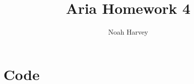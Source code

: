 \documentclass{report}
\begin{document}
\title{Aria Homework 4}
\author{Noah Harvey}
\maketitle
\chapter*{Code}



\end{document}
